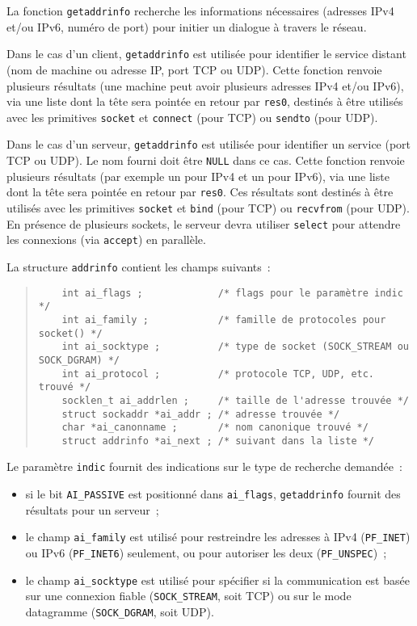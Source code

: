 \documentclass [twoside] {report}
\begin{document}
La fonction \texttt {getaddrinfo} recherche les informations
nécessaires (adresses IPv4 et/ou IPv6, numéro de port) pour initier
un dialogue à travers le réseau.

Dans le cas d'un client, \texttt {getaddrinfo} est utilisée pour
identifier le service distant (nom de machine ou adresse IP, port
TCP ou UDP).  Cette fonction renvoie plusieurs résultats (une machine
peut avoir plusieurs adresses IPv4 et/ou IPv6), via une liste dont
la tête sera pointée en retour par \texttt {res0}, destinés à être
utilisés avec les primitives \texttt {socket} et \texttt {connect}
(pour TCP) ou \texttt {sendto} (pour UDP).

Dans le cas d'un serveur, \texttt {getaddrinfo} est utilisée pour
identifier un service (port TCP ou UDP). Le nom fourni doit être
\texttt {NULL} dans ce cas. Cette fonction renvoie plusieurs résultats
(par exemple un pour IPv4 et un pour IPv6), via une liste dont la
tête sera pointée en retour par \texttt {res0}. Ces résultats sont
destinés à être utilisés avec les primitives \texttt {socket} et
\texttt {bind} (pour TCP) ou \texttt {recvfrom} (pour UDP). En
présence de plusieurs sockets, le serveur devra utiliser \texttt
{select} pour attendre les connexions (via \texttt {accept}) en
parallèle.

La structure \texttt {addrinfo} contient les champs suivants~:

\begin {quote}
    \small
\begin {verbatim}
    int ai_flags ;             /* flags pour le paramètre indic */
    int ai_family ;            /* famille de protocoles pour socket() */
    int ai_socktype ;          /* type de socket (SOCK_STREAM ou SOCK_DGRAM) */
    int ai_protocol ;          /* protocole TCP, UDP, etc. trouvé */
    socklen_t ai_addrlen ;     /* taille de l'adresse trouvée */
    struct sockaddr *ai_addr ; /* adresse trouvée */
    char *ai_canonname ;       /* nom canonique trouvé */
    struct addrinfo *ai_next ; /* suivant dans la liste */
\end{verbatim}
\end {quote}

Le paramètre \texttt {indic} fournit des indications sur le type 
de recherche demandée~:

\begin {itemize}
    \item si le bit \texttt {AI\_PASSIVE} est positionné dans \texttt
	{ai\_flags}, \texttt {getaddrinfo} fournit des résultats pour
	un serveur~;

    \item le champ \texttt {ai\_family} est utilisé pour restreindre
	les adresses à IPv4 (\texttt {PF\_INET}) ou IPv6 (\texttt
	{PF\_INET6}) seulement, ou pour autoriser les deux (\texttt
	{PF\_UNSPEC})~;

    \item le champ \texttt {ai\_socktype} est utilisé pour spécifier
	si la communication est basée sur une connexion fiable
	(\texttt {SOCK\_STREAM}, soit TCP) ou sur le mode datagramme
	(\texttt {SOCK\_DGRAM}, soit UDP).

\end {itemize}
\end{document}
